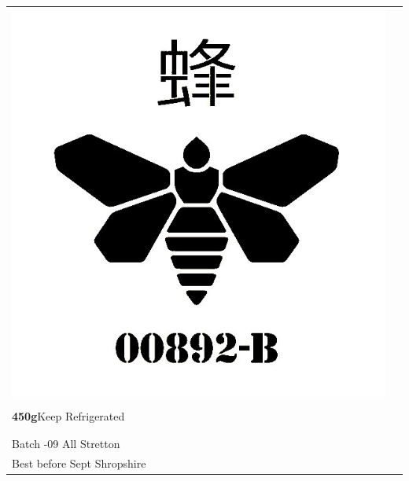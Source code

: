\documentclass[12pt, a4paper]{letter}
\begin{document}
\newcommand\goldenmothlabel{%
\rule{0mm}{10mm}
\begin{tabular}{@{}ll}%
\begin{minipage}{2.5cm}%
\includegraphics[scale=0.13]{golden-moth-chemical-logo.jpg}
\end{minipage}%
&
\begin{minipage}{5cm}
  \textbf{\fontsize{20pt}{20pt}\selectfont GOLDEN MOTH\\}
  \\
  \textbf{450g}\hfill Keep Refrigerated\\
  \scriptsize\\
  \strut\hfill \\
  Batch \the\year{}-09 \hfill All Stretton\\
  \AdvanceDate[365]
  Best before Sept \the\year{} \hfill Shropshire
\end{minipage}
\end{tabular}
}%

\begin{labels}
%
{%
  \goldenmothlabel
  
}%
\end{labels}
\end{document}
